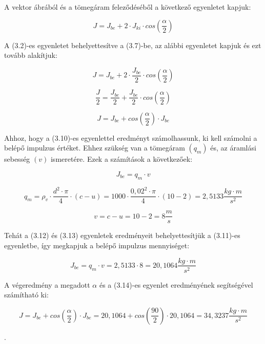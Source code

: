\noindent A vektor ábrából és a tömegáram feleződéséből a következő egyenletet kapjuk:

\begin{equation}
J=J_{be}+2\cdot{J_{ki}\cdot{cos\left(\frac{\alpha}{2}\right)}}
\end{equation}

\noindent A (3.2)-es egyenletet behelyettesítve a (3.7)-be, az alábbi egyenletet kapjuk és ezt tovább alakítjuk:

\begin{equation}
J=J_{be}+2\cdot\frac{J_{be}}{2}\cdot{cos\left(\frac{\alpha}{2}\right)}
\end{equation}

\begin{equation}
\frac{J}{2}=\frac{J_{be}}{2}+\frac{J_{be}}{2}\cdot{cos\left(\frac{\alpha}{2}\right)}
\end{equation}

\begin{equation}
J=J_{be}+{cos\left(\frac{\alpha}{2}\right)}\cdot{J_{be}}
\end{equation}

\noindent Ahhoz, hogy a (3.10)-es egyenlettel eredményt számolhassunk, ki kell számolni a belépő impulzus értéket. Ehhez szükség van a tömegáram $(q_m)$ és, az áramlási sebesség $(v)$ ismeretére. Ezek a számítások a következőek:

\begin{equation}
J_{be}=q_m\cdot{v}
\end{equation}

\begin{equation}
q_m=\rho_v\cdot{\frac{d^2\cdot{\pi}}{4}}\cdot(c-u)=1000\cdot{\frac{0,02^2\cdot{\pi}}{4}}\cdot(10-2)=2,5133  {\frac{kg\cdot{m}}{s^2}}
\end{equation}

\begin{equation}
v=c-u=10-2=8\frac{m}{s}
\end{equation}

\noindent Tehát a (3.12) és (3.13) egyenletek eredményeit behelyettesítjük a (3.11)-es egyenletbe, így megkapjuk a belépő impulzus mennyiséget:

\begin{equation}
J_{be}=q_m\cdot{v}=2,5133\cdot{8}=20,1064\frac{kg\cdot{m}}{s^2}
\end{equation}

\noindent A végeredmény a megadott $\alpha$ és a (3.14)-es egyenlet eredményének segítségével számítható ki:

\begin{equation}
J=J_{be}+{cos\left(\frac{\alpha}{2}\right)}\cdot{J_{be}}=20,1064+{cos\left(\frac{90}{2}\right)}\cdot{20,1064}=34,3237 \frac{kg\cdot{m}}{s^2}
\end{equation}


\noindent{}.

\pagebreak
